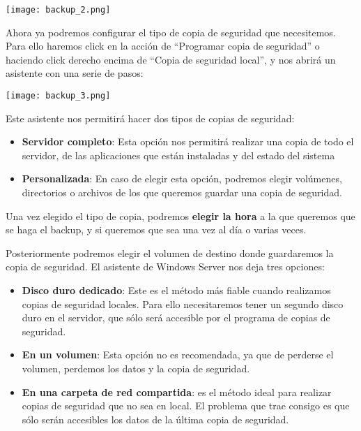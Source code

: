 \begin{center}
    \vspace{-20pt}
    \texttt{[image: backup\_2.png]}
    \vspace{-20pt}
\end{center}

Ahora ya podremos configurar el tipo de copia de seguridad que necesitemos. Para ello haremos click en la acción de “Programar copia de seguridad” o haciendo click derecho encima de “Copia de seguridad local”, y nos abrirá un asistente con una serie de pasos:

\begin{center}
    \vspace{-20pt}
    \texttt{[image: backup\_3.png]}
    \vspace{-20pt}
\end{center}

Este asistente nos permitirá hacer dos tipos de copias de seguridad:

\begin{itemize}
    \item \textbf{Servidor completo}: Esta opción nos permitirá realizar una copia de todo el servidor, de las aplicaciones que están instaladas y del estado del sistema
    \item \textbf{Personalizada}: En caso de elegir esta opción, podremos elegir volúmenes, directorios o archivos de los que queremos guardar una copia de seguridad.
\end{itemize}

Una vez elegido el tipo de copia, podremos \textbf{elegir la hora} a la que queremos que se haga el backup, y si queremos que sea una vez al día o varias veces.

Posteriormente podremos elegir el volumen de destino donde guardaremos la copia de seguridad. El asistente de Windows Server nos deja tres opciones:

\begin{itemize}
    \item \textbf{Disco duro dedicado}: Este es el método más fiable cuando realizamos copias de seguridad locales. Para ello necesitaremos tener un segundo disco duro en el servidor, que sólo será accesible por el programa de copias de seguridad.
    \item \textbf{En un volumen}: Esta opción no es recomendada, ya que de perderse el volumen, perdemos los datos y la copia de seguridad.
    \item \textbf{En una carpeta de red compartida}: es el método ideal para realizar copias de seguridad que no sea en local. El problema que trae consigo es que sólo serán accesibles los datos de la última copia de seguridad.
\end{itemize}

